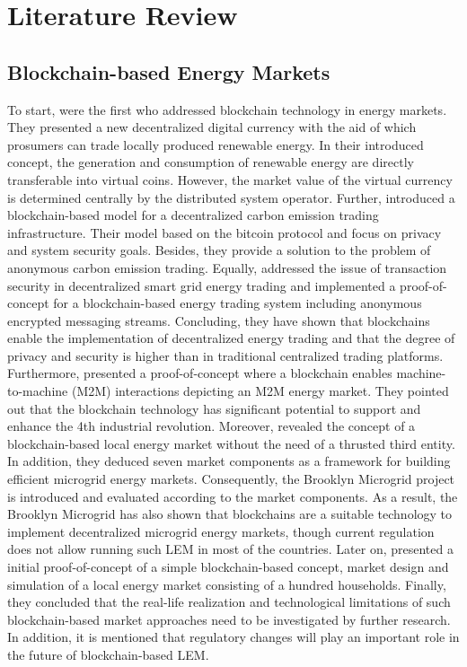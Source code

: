 \section{Literature Review}
\label{sec:literature_review}

\subsection{Blockchain-based Energy Markets}
\label{sec:Blockchain-based Energy Markets}
To start,  were the first who addressed blockchain technology in
energy markets. They presented a new decentralized digital currency with the aid of
which prosumers can trade locally produced renewable energy.
In their introduced concept, the generation and consumption of renewable energy are directly
transferable into virtual coins. However, the market value of the virtual currency is determined
centrally by the distributed system operator. Further,  introduced a blockchain-based
model for a decentralized carbon emission trading infrastructure.
Their model based on the bitcoin protocol and focus on privacy and system security goals.
Besides, they provide a solution to the problem of anonymous carbon emission trading.
Equally,  addressed the issue of transaction security in
decentralized smart grid energy trading and implemented a proof-of-concept for a
blockchain-based energy trading system including anonymous encrypted messaging streams.
Concluding, they have shown that blockchains enable the implementation of decentralized energy trading and that the degree
of privacy and security is higher than in traditional centralized trading platforms. 
Furthermore, 
presented a proof-of-concept where a blockchain enables machine-to-machine (M2M) interactions depicting an
M2M energy market. They pointed out that the blockchain technology has
significant potential to support and enhance the 4th industrial revolution. 
Moreover, 
revealed the concept of a blockchain-based local energy market without the need of a thrusted
third entity. In addition, they deduced seven market
components as a framework for building efficient microgrid energy markets. Consequently,
the Brooklyn Microgrid project is introduced and evaluated according to the market components.
As a result, the Brooklyn Microgrid has also shown that blockchains are a suitable technology
to implement decentralized microgrid energy markets, though current regulation does not
allow running such LEM in most of the countries. Later on, 
presented a initial proof-of-concept of a simple blockchain-based concept, market design and
simulation of a local energy market consisting of a hundred households.
Finally, they concluded that the real-life realization and technological limitations of such blockchain-based
market approaches need to be investigated by further research. 
In addition, it is mentioned that regulatory
changes will play an important role in the future of blockchain-based LEM.

